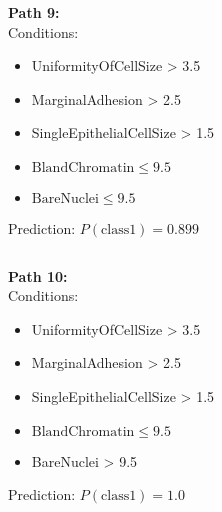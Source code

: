 \documentclass[12pt]{article}
\begin{document}
\[\quad\]

\textbf{Path 9:} \\
Conditions:
\begin{itemize}
\item \mbox{UniformityOfCellSize} > 3.5
\item \mbox{MarginalAdhesion} > 2.5
\item \mbox{SingleEpithelialCellSize} > 1.5
\item $\mbox{BlandChromatin} \leq 9.5$
\item $\mbox{BareNuclei} \leq 9.5$
\end{itemize}
Prediction: $P(\mbox{class} 1) = 0.899$

\[\quad\]

\textbf{Path 10:} \\
Conditions:
\begin{itemize}
\item \mbox{UniformityOfCellSize} > 3.5
\item \mbox{MarginalAdhesion} > 2.5
\item \mbox{SingleEpithelialCellSize} > 1.5
\item $\mbox{BlandChromatin} \leq 9.5$
\item \mbox{BareNuclei} > 9.5
\end{itemize}
Prediction: $P(\mbox{class} 1) = 1.0$
\end{document}
